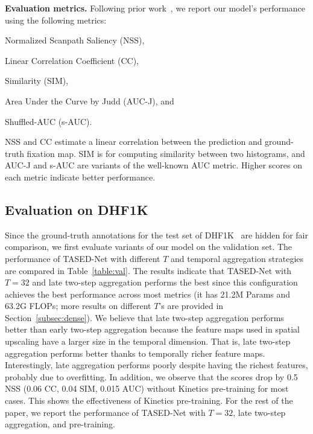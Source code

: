 \documentclass[10pt,twocolumn,letterpaper]{article}
\newcommand{\modelname}{TASED-Net}
\begin{document}
\textbf{Evaluation metrics.} Following prior work~\cite{wang2018revisiting}, we report our model's performance using the following metrics:
\begin{inlinelist}
 \item Normalized Scanpath Saliency (NSS),
 \item Linear Correlation Coefficient (CC),
 \item Similarity (SIM),
 \item Area Under the Curve by Judd (AUC-J), and
 \item Shuffled-AUC (s-AUC).
\end{inlinelist}
 NSS and CC estimate a linear correlation between the prediction and ground-truth fixation map. SIM is for computing similarity between two histograms, and AUC-J and s-AUC are variants of the well-known AUC metric. Higher scores on each metric indicate better performance.

\subsection{Evaluation on DHF1K} \label{subsec:on-dhf1k}

Since the ground-truth annotations for the test set of DHF1K~\cite{wang2018revisiting} are hidden for fair comparison, we first evaluate variants of our model on the validation set. The performance of \modelname{} with different $T$ and temporal aggregation strategies are compared in Table~\ref{table:val}. The results indicate that \modelname{} with $T=32$ and late two-step aggregation performs the best since this configuration achieves the best performance across most metrics (it has 21.2M Params and 63.2G FLOPs; more results on different $T$'s are provided in Section~\ref{subsec:dense}). We believe that late two-step aggregation performs better than early two-step aggregation because the feature maps used in spatial upscaling have a larger size in the temporal dimension. That is, late two-step aggregation performs better thanks to temporally richer feature maps. Interestingly, late aggregation performs poorly despite having the richest features, probably due to overfitting. In addition, we observe that the scores drop by 0.5 NSS (0.06 CC, 0.04 SIM, 0.015 AUC) without Kinetics pre-training for most cases. This shows the effectiveness of Kinetics pre-training. For the rest of the paper, we report the performance of \modelname{} with $T=32$, late two-step aggregation, and pre-training.
\end{document}
